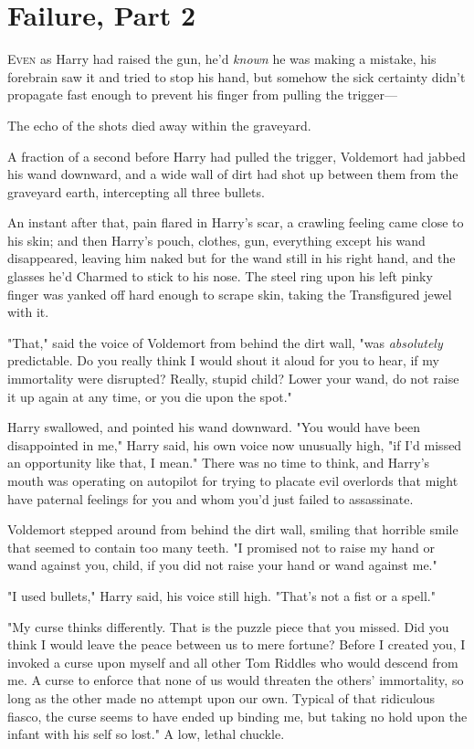 \chapter{Failure, Part 2}

\lettrine{E}{ven} as Harry had
raised the gun, he'd \emph{known} he was making a mistake, his forebrain saw it
and tried to stop his hand, but somehow the sick certainty didn't propagate
fast enough to prevent his finger from pulling the trigger---

The echo of the shots died away within the graveyard.

A fraction of a second before Harry had pulled the trigger, Voldemort had
jabbed his wand downward, and a wide wall of dirt had shot up between them from
the graveyard earth, intercepting all three bullets.

An instant after that, pain flared in Harry's scar, a crawling feeling came
close to his skin; and then Harry's pouch, clothes, gun, everything except his
wand disappeared, leaving him naked but for the wand still in his right hand,
and the glasses he'd Charmed to stick to his nose. The steel ring upon his left
pinky finger was yanked off hard enough to scrape skin, taking the Transfigured
jewel with it.

"That," said the voice of Voldemort from behind the dirt wall, "was
\emph{absolutely} predictable. Do you really think I would shout it aloud for
you to hear, if my immortality were disrupted? Really, stupid child? Lower your
wand, do not raise it up again at any time, or you die upon the spot."

Harry swallowed, and pointed his wand downward. "You would have been
disappointed in me," Harry said, his own voice now unusually high, "if I'd
missed an opportunity like that, I mean." There was no time to think, and
Harry's mouth was operating on autopilot for trying to placate evil overlords
that might have paternal feelings for you and whom you'd just failed to
assassinate.

Voldemort stepped around from behind the dirt wall, smiling that horrible smile
that seemed to contain too many teeth. "I promised not to raise my hand or wand
against you, child, if you did not raise your hand or wand against me."

"I used bullets," Harry said, his voice still high. "That's not a fist or a
spell."

"My curse thinks differently. That is the puzzle piece that you missed. Did you
think I would leave the peace between us to mere fortune? Before I created you,
I invoked a curse upon myself and all other Tom Riddles who would descend from
me. A curse to enforce that none of us would threaten the others' immortality,
so long as the other made no attempt upon our own. Typical of that ridiculous
fiasco, the curse seems to have ended up binding me, but taking no hold upon
the infant with his self so lost." A low, lethal chuckle. 

